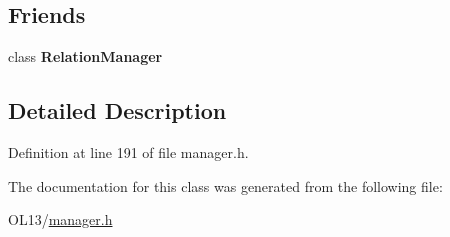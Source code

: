 \subsection*{Friends}
\begin{DoxyCompactItemize}
\item 
\mbox{\label{class_relation_manager_1_1_iterator_a55fae9c2e48742dd0a8596e6d8721775}} 
class {\bfseries Relation\+Manager}
\end{DoxyCompactItemize}


\subsection{Detailed Description}


Definition at line 191 of file manager.\+h.



The documentation for this class was generated from the following file\+:\begin{DoxyCompactItemize}
\item 
O\+L13/\hyperlink{manager_8h}{manager.\+h}\end{DoxyCompactItemize}

